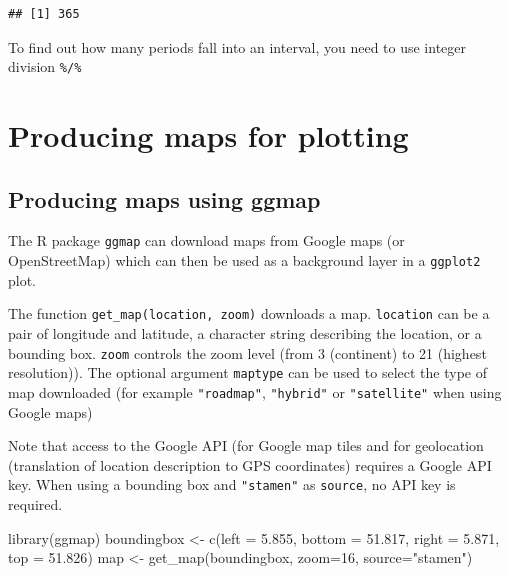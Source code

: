 \documentclass[
]{book}
\newenvironment{Shaded}{\begin{snugshade}}{\end{snugshade}}
\newcommand{\AttributeTok}[1]{\textcolor[rgb]{0.77,0.63,0.00}{#1}}
\newcommand{\DecValTok}[1]{\textcolor[rgb]{0.00,0.00,0.81}{#1}}
\newcommand{\FloatTok}[1]{\textcolor[rgb]{0.00,0.00,0.81}{#1}}
\newcommand{\FunctionTok}[1]{\textcolor[rgb]{0.00,0.00,0.00}{#1}}
\newcommand{\NormalTok}[1]{#1}
\newcommand{\OtherTok}[1]{\textcolor[rgb]{0.56,0.35,0.01}{#1}}
\newcommand{\StringTok}[1]{\textcolor[rgb]{0.31,0.60,0.02}{#1}}
\begin{document}
\begin{verbatim}
## [1] 365
\end{verbatim}

To find out how many periods fall into an interval, you need to use integer division \texttt{\%/\%}

\hypertarget{producing-maps-for-plotting}{%
\chapter{Producing maps for plotting}\label{producing-maps-for-plotting}}

\hypertarget{producing-maps-using-ggmap}{%
\section{Producing maps using ggmap}\label{producing-maps-using-ggmap}}

The R package \texttt{ggmap} can download maps from Google maps (or OpenStreetMap) which can then be used as a background layer in a \texttt{ggplot2} plot.

The function \texttt{get\_map(location,\ zoom)} downloads a map. \texttt{location} can be a pair of longitude and latitude, a character string describing the location, or a bounding box. \texttt{zoom} controls the zoom level (from 3 (continent) to 21 (highest resolution)). The optional argument \texttt{maptype} can be used to select the type of map downloaded (for example \texttt{"roadmap"}, \texttt{"hybrid"} or \texttt{"satellite"} when using Google maps)

Note that access to the Google API (for Google map tiles and for geolocation (translation of location description to GPS coordinates) requires a Google API key. When using a bounding box and \texttt{"stamen"} as \texttt{source}, no API key is required.

\begin{Shaded}
\begin{Highlighting}[]
\FunctionTok{library}\NormalTok{(ggmap)}
\NormalTok{boundingbox }\OtherTok{\textless{}{-}} \FunctionTok{c}\NormalTok{(}\AttributeTok{left =} \FloatTok{5.855}\NormalTok{, }\AttributeTok{bottom =} \FloatTok{51.817}\NormalTok{, }\AttributeTok{right =} \FloatTok{5.871}\NormalTok{, }\AttributeTok{top =} \FloatTok{51.826}\NormalTok{)}
\NormalTok{map }\OtherTok{\textless{}{-}} \FunctionTok{get\_map}\NormalTok{(boundingbox, }\AttributeTok{zoom=}\DecValTok{16}\NormalTok{, }\AttributeTok{source=}\StringTok{"stamen"}\NormalTok{)}
\end{Highlighting}
\end{Shaded}
\end{document}
